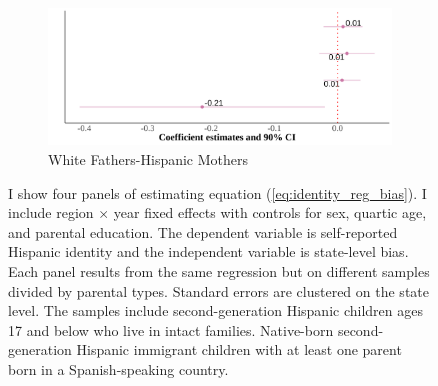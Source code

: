 \documentclass[12pt,english]{article}
\begin{document}
\begin{center}
\begin{figure}[!htb]
\begin{subfigure}{.48\textwidth}
\caption{White Fathers-Hispanic Mothers}
\centering
\includegraphics[width=.9\linewidth]{figure/county-by-parents-regs-wh.png}
\end{subfigure}
\caption*{\footnotesize{I show four panels of estimating equation (\ref{eq:identity_reg_bias}). I include region $\times$ year fixed effects with controls for sex, quartic age, and parental education. The dependent variable is self-reported Hispanic identity and the independent variable is state-level bias. Each panel results from the same regression but on different samples divided by parental types. Standard errors are clustered on the state level. The samples include second-generation Hispanic children ages 17 and below who live in intact families. Native-born second-generation Hispanic immigrant children with at least one parent born in a Spanish-speaking country.}}
\end{figure}
\end{center}

\pagebreak
\newpage
\end{document}
